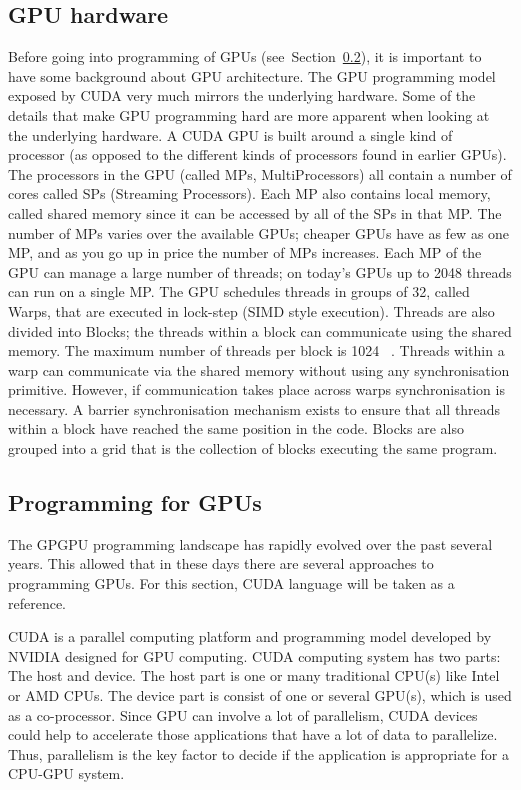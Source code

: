 \documentclass[Ingles]{ic-tese-v1}
\newcommand{\rsec}[1]{Section~\ref{sec:#1}}
\begin{document}
\subsection{GPU hardware}
\label{sec:gpugardware}
Before going into programming of GPUs (see~\rsec{gpuprogramming}), it is important to have some background about GPU architecture.
The GPU programming model exposed by CUDA very much mirrors the underlying
hardware. Some of the details that make GPU programming hard are more apparent
when looking at the underlying hardware.
A CUDA GPU is built around a single kind of processor (as opposed to the different
kinds of processors found in earlier GPUs). The processors in the GPU (called
MPs, MultiProcessors) all contain a number of cores called SPs (Streaming Processors).
Each MP also contains local memory, called shared memory since it can be
accessed by all of the SPs in that MP. The number of MPs varies over the available
GPUs; cheaper GPUs have as few as one MP, and as you go up in price the number
of MPs increases.
Each MP of the GPU can manage a large number of threads; on today’s GPUs
up to 2048 threads can run on a single MP. The GPU schedules threads in groups
of 32, called Warps, that are executed in lock-step (SIMD style execution). Threads are also divided into Blocks; the threads within a block can communicate using the
shared memory. The maximum number of threads per block is 1024 ~\cite{NvidiaGuide2018}. Threads within
a warp can communicate via the shared memory without using any synchronisation
primitive. However, if communication takes place across warps synchronisation is
necessary. A barrier synchronisation mechanism exists to ensure that all threads
within a block have reached the same position in the code. Blocks are also grouped
into a grid that is the collection of blocks executing the same program.

\subsection{Programming for GPUs}
\label{sec:gpuprogramming}
The GPGPU programming landscape has rapidly evolved over the past several years. This allowed that in these days there are several approaches to programming GPUs. For this section, CUDA language will be taken as a reference.

CUDA is a parallel computing platform and programming model developed by NVIDIA designed for GPU computing.
CUDA computing system has two parts: The host and device.
The host part is one or many traditional CPU(s) like Intel or AMD CPUs. The
device part is consist of one or several GPU(s), which is used as a co-processor. Since
GPU can involve a lot of parallelism, CUDA devices could help to accelerate those applications that have a lot of data to  parallelize. Thus, parallelism is the key factor to decide if the application is appropriate for a CPU-GPU system.
\end{document}
